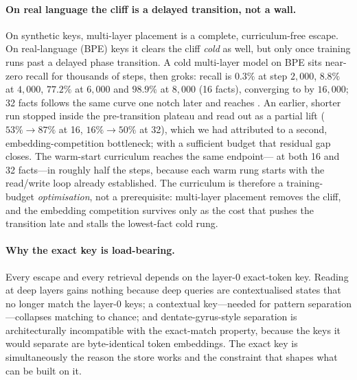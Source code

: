 \paragraph{On real language the cliff is a delayed transition, not a wall.} On
synthetic keys, multi-layer placement is a complete, curriculum-free escape. On
real-language (BPE) keys it clears the cliff \emph{cold} as well, but only once
training runs past a delayed phase transition. A cold multi-layer model on BPE sits
near-zero recall for thousands of steps, then groks: recall is $0.3\%$ at step
$2{,}000$, $8.8\%$ at $4{,}000$, $77.2\%$ at $6{,}000$ and $98.9\%$ at $8{,}000$
(16 facts), converging to  by $16{,}000$; 32 facts follows the same
curve one notch later and reaches . An earlier, shorter run stopped
inside the pre-transition plateau and read out as a partial lift ($53\%\!\to\!87\%$
at 16, $16\%\!\to\!50\%$ at 32), which we had attributed to a second,
embedding-competition bottleneck; with a sufficient budget that residual gap
closes. The warm-start curriculum reaches the same endpoint--- at both
16 and 32 facts---in roughly half the steps, because each warm rung starts with the
read/write loop already established. The curriculum is therefore a training-budget
\emph{optimisation}, not a prerequisite: multi-layer placement removes the cliff,
and the embedding competition survives only as the cost that pushes the transition
late and stalls the lowest-fact cold rung.

\paragraph{Why the exact key is load-bearing.} Every escape and every retrieval
depends on the layer-0 exact-token key. Reading at deep layers gains nothing
because deep queries are contextualised states that no longer match the layer-0
keys; a contextual key---needed for pattern separation---collapses matching to
chance; and dentate-gyrus-style separation is architecturally incompatible with
the exact-match property, because the keys it would separate are byte-identical
token embeddings. The exact key is simultaneously the reason the store works and
the constraint that shapes what can be built on it.
